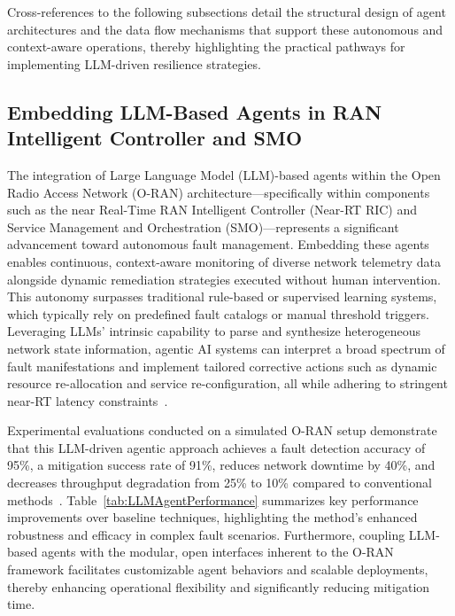 \documentclass[sigconf]{acmart}
\begin{document}
Cross-references to the following subsections detail the structural design of agent architectures and the data flow mechanisms that support these autonomous and context-aware operations, thereby highlighting the practical pathways for implementing LLM-driven resilience strategies.

\subsection{Embedding LLM-Based Agents in RAN Intelligent Controller and SMO}

The integration of Large Language Model (LLM)-based agents within the Open Radio Access Network (O-RAN) architecture—specifically within components such as the near Real-Time RAN Intelligent Controller (Near-RT RIC) and Service Management and Orchestration (SMO)—represents a significant advancement toward autonomous fault management. Embedding these agents enables continuous, context-aware monitoring of diverse network telemetry data alongside dynamic remediation strategies executed without human intervention. This autonomy surpasses traditional rule-based or supervised learning systems, which typically rely on predefined fault catalogs or manual threshold triggers. Leveraging LLMs’ intrinsic capability to parse and synthesize heterogeneous network state information, agentic AI systems can interpret a broad spectrum of fault manifestations and implement tailored corrective actions such as dynamic resource re-allocation and service re-configuration, all while adhering to stringent near-RT latency constraints~\cite{ref55}.

Experimental evaluations conducted on a simulated O-RAN setup demonstrate that this LLM-driven agentic approach achieves a fault detection accuracy of 95\%, a mitigation success rate of 91\%, reduces network downtime by 40\%, and decreases throughput degradation from 25\% to 10\% compared to conventional methods~\cite{ref55}. Table~\ref{tab:LLMAgentPerformance} summarizes key performance improvements over baseline techniques, highlighting the method’s enhanced robustness and efficacy in complex fault scenarios. Furthermore, coupling LLM-based agents with the modular, open interfaces inherent to the O-RAN framework facilitates customizable agent behaviors and scalable deployments, thereby enhancing operational flexibility and significantly reducing mitigation time.
\end{document}
